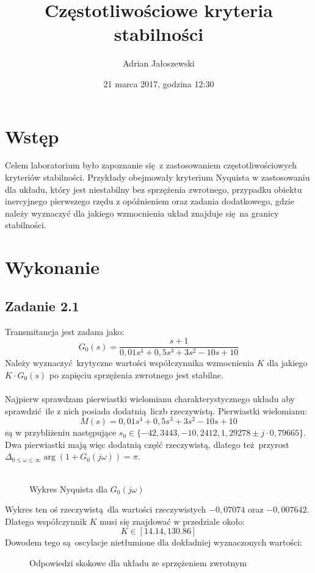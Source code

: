 \documentclass[a4paper, 12pt]{article}
\title{Częstotliwościowe kryteria stabilności}
\author{Adrian Jałoszewski}
\date{21 marca 2017, godzina 12:30}
\begin{document}
	\lstset{language=Python, basicstyle=\footnotesize,
		keepspaces=true,frame=single,tabsize=4}
	\maketitle
	\section{Wstęp}
		Celem laboratorium było zapoznanie się z zastosowaniem częstotliwościowych kryteriów stabilności. Przykłady obejmowały kryterium Nyquista w zastosowaniu dla układu, który jest niestabilny bez sprzężenia zwrotnego, przypadku obiektu inercyjnego pierwszego rzędu z opóźnieniem oraz zadania dodatkowego, gdzie należy wyznaczyć dla jakiego wzmocnienia układ znajduje się na granicy stabilności.
	\section{Wykonanie}
		\subsection{Zadanie 2.1}
		Transmitancja jest zadana jako:
		$$
			G_0(s) = \frac{s + 1}{0,01s^4 + 0,5s^3 + 3 s^2 -10s + 10}
		$$ \noindent
		Należy wyznaczyć krytyczne wartości współczynnika wzmocnienia $K$ dla jakiego $K \cdot G_0(s)$ po zapięciu sprzężenia zwrotnego jest stabilne.
		\\
		\\
		Najpierw sprawdzam pierwiastki wielomianu charakterystycznego układu aby sprawdzić ile z nich posiada dodatnią liczb rzeczywistą. Pierwiastki wielomianu: 
		$$
			M(s) = 0,01s^4 + 0,5s^3 + 3 s^2 -10s + 10
		$$
		są w przybliżeniu następujące $s_0 \in \{-42,3443, -10,2412, 1,29278 \pm j\cdot 0,79665\}$. Dwa \linebreak pierwiastki mają więc dodatnią część rzeczywistą, dlatego też przyrost \linebreak $\Delta_{0 \leq \omega \leq \infty} \arg(1 + G_0(j\omega)) = \pi$. \\ \\
		\begin{figure}[H]
			\centering
			\def \svgwidth{0.7\columnwidth}
			
			\caption{Wykres Nyquista dla $G_0(j\omega)$}
		\end{figure}\noindent
		Wykres ten oś rzeczywistą dla wartości rzeczywistych $-0,07074$ oraz $-0,007642$. Dlatego współczynnik $K$ musi się znajdować w przedziale około:
		$$
			K \in [14.14, 130.86]
		$$
		Dowodem tego są oscylacje nietłumione dla dokładniej wyznaczonych wartości:
		\begin{figure}[H]
			\centering
			\def \svgwidth{0.49\columnwidth}
			
			\def \svgwidth{0.49\columnwidth}
			
			\caption{Odpowiedzi skokowe dla układu ze sprzężeniem zwrotnym}
		\end{figure}\noindent
		\newpage
\end{document}
